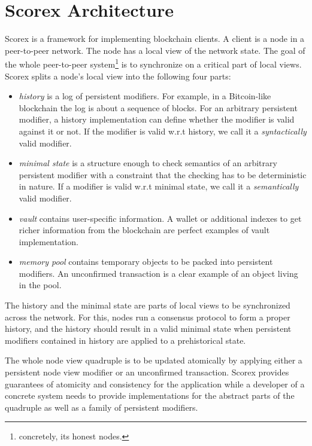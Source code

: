 
\section{Scorex Architecture}
\label{sec:scorex}

Scorex is a framework for implementing blockchain clients. A client is a node in a peer-to-peer network. The node has a local view of the network state. The goal of the whole peer-to-peer system\footnote{concretely, its honest nodes.} is to synchronize on a critical part of local views. Scorex splits a node's local view into the following four parts: 

\begin{itemize}
\item{\em history} is a log of persistent modifiers. For example, in a Bitcoin-like blockchain the log is about a sequence of blocks. For an arbitrary persistent modifier, a history implementation can define whether the modifier is valid against it or not.
If the modifier is valid w.r.t history, we call it a {\em syntactically} valid modifier.   
\item{\em minimal state} is a structure enough to check semantics of an arbitrary persistent modifier with a constraint that the checking has to be deterministic in nature. If a modifier is valid w.r.t minimal state, we call it a {\em semantically} valid modifier.
\item{\em vault} contains user-specific information. A wallet or additional indexes to get richer information from the blockchain are perfect examples of vault implementation. 
\item{\em memory pool} contains temporary objects to be packed into persistent modifiers. An unconfirmed transaction is a clear example of an object living in the pool.
\end{itemize}

The history and the minimal state are parts of local views to be synchronized across the network. For this, nodes run a consensus protocol to form a proper history, and the history should result in a valid minimal state when persistent modifiers contained in history are applied to a prehistorical state.

The whole node view quadruple is to be updated atomically by applying either a persistent node view modifier or an unconfirmed transaction. Scorex provides guarantees of atomicity and consistency for the application while a developer of a concrete system needs to provide implementations for the abstract parts of the quadruple as well as a family of persistent modifiers.

